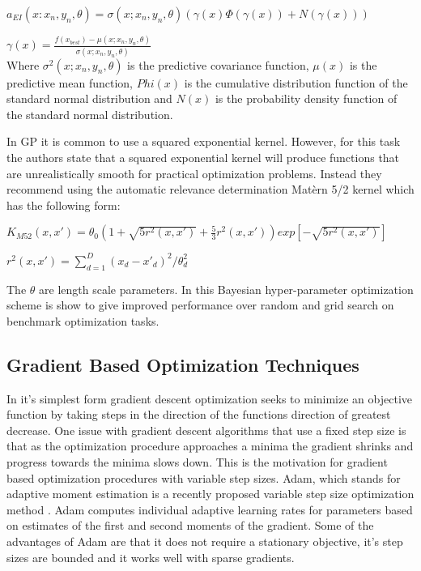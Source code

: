 \documentclass[12pt,letterpaper]{article}
\begin{document}
$a_{EI}(x:{x_n,y_n}, \theta)= \sigma(x;{x_n,y_n},\theta) (\gamma(x) \Phi(\gamma(x)) + N(\gamma(x)))$

$\gamma(x) = \frac{f(x_{best}) - \mu(x;{x_n,y_n}, \theta)}{\sigma(x;{x_n,y_n},\theta)}$
\\
Where $\sigma^2(x;{x_n,y_n},\theta)$ is the predictive covariance function, $\mu(x)$ is the predictive mean function, $Phi(x)$ is the cumulative distribution function of the standard normal distribution and $N(x)$ is the probability density function of the standard normal distribution.

In GP it is common to use a squared exponential kernel.  However, for this task the authors state that a squared exponential kernel will produce functions that are unrealistically smooth for practical optimization problems.  Instead they recommend using the automatic relevance determination Mat\`ern 5/2 kernel which has the following form:

$K_{M52}(x,x') = \theta_0(1 + \sqrt{5r^2(x,x')} + \frac{5}{3}r^2(x,x'))exp[-\sqrt{5r^2(x,x')}]$

$r^2(x,x') = \sum_{d=1}^{D}(x_d - x'_d)^2/\theta_d^2$

The $\theta$ are length scale parameters.  In \cite{Snoek:2012:PBO:2999325.2999464} this Bayesian hyper-parameter optimization scheme is show to give improved performance over random and grid search on benchmark optimization tasks.

\subsection{Gradient Based Optimization Techniques}

In it's simplest form gradient descent optimization seeks to minimize an objective function by taking steps in the direction of the functions direction of greatest decrease.  One issue with gradient descent algorithms that use a fixed step size is that as the optimization procedure approaches a minima the gradient shrinks and progress towards the minima slows down.  This is the motivation for gradient based optimization procedures with variable step sizes.  Adam, which stands for adaptive moment estimation is a recently proposed variable step size optimization method \cite{journals/corr/KingmaB14}. Adam computes individual adaptive learning rates for parameters based on estimates of the first and second moments of the gradient.  Some of the advantages of Adam are that it does not require a stationary objective, it's step sizes are bounded and it works well with sparse gradients.  
\end{document}
